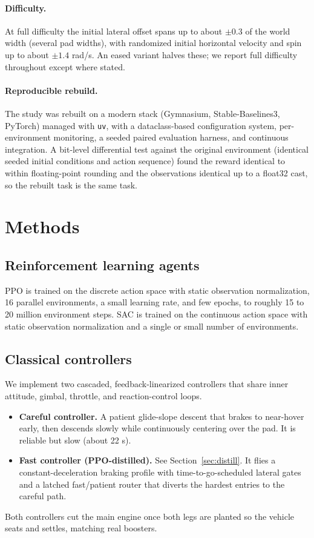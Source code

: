 \documentclass[10pt,twocolumn]{article}
\begin{document}
\paragraph{Difficulty.} At full difficulty the initial lateral offset spans up to about $\pm0.3$ of the world width (several pad widths), with randomized initial horizontal velocity and spin up to about $\pm1.4$ rad/s. An eased variant halves these; we report full difficulty throughout except where stated.

\paragraph{Reproducible rebuild.} The study was rebuilt on a modern stack (Gymnasium, Stable-Baselines3, PyTorch) managed with \texttt{uv}, with a dataclass-based configuration system, per-environment monitoring, a seeded paired evaluation harness, and continuous integration. A bit-level differential test against the original environment (identical seeded initial conditions and action sequence) found the reward identical to within floating-point rounding and the observations identical up to a float32 cast, so the rebuilt task is the same task.

\section{Methods}

\subsection{Reinforcement learning agents}
PPO is trained on the discrete action space with static observation normalization, 16 parallel environments, a small learning rate, and few epochs, to roughly 15 to 20 million environment steps. SAC is trained on the continuous action space with static observation normalization and a single or small number of environments.

\subsection{Classical controllers}
We implement two cascaded, feedback-linearized controllers that share inner attitude, gimbal, throttle, and reaction-control loops.
\begin{itemize}
  \item \textbf{Careful controller.} A patient glide-slope descent that brakes to near-hover early, then descends slowly while continuously centering over the pad. It is reliable but slow (about 22 s).
  \item \textbf{Fast controller (PPO-distilled).} See Section~\ref{sec:distill}. It flies a constant-deceleration braking profile with time-to-go-scheduled lateral gates and a latched fast/patient router that diverts the hardest entries to the careful path.
\end{itemize}
Both controllers cut the main engine once both legs are planted so the vehicle seats and settles, matching real boosters.
\end{document}
